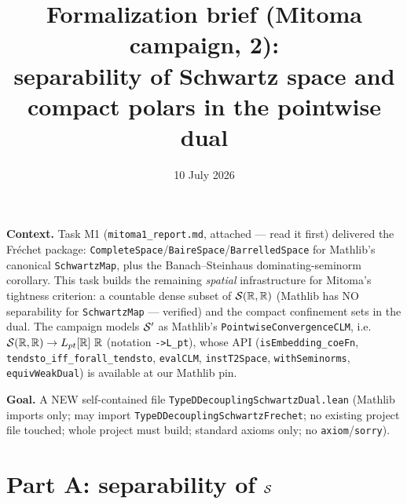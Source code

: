 \documentclass[11pt]{article}
\title{Formalization brief (Mitoma campaign, 2):\\
separability of Schwartz space and compact polars in the pointwise dual}
\date{10 July 2026}
\theoremstyle{plain}
\theoremstyle{remark}
\begin{document}
\maketitle

\noindent\textbf{Context.} Task M1 (\texttt{mitoma1\_report.md}, attached ---
read it first) delivered the Fr\'echet package:
\texttt{CompleteSpace}/\texttt{BaireSpace}/\texttt{BarrelledSpace} for
Mathlib's canonical \texttt{SchwartzMap}, plus the Banach--Steinhaus
dominating-seminorm corollary. This task builds the remaining
\emph{spatial} infrastructure for Mitoma's tightness criterion: a countable
dense subset of $\mathcal{S}(\mathbb{R},\mathbb{R})$ (Mathlib has NO separability for
\texttt{SchwartzMap} --- verified) and the compact confinement sets in the
dual. The campaign models $\mathcal{S}'$ as Mathlib's
\texttt{PointwiseConvergenceCLM}, i.e.\ $\mathcal{S}(\mathbb{R},\mathbb{R})\to L_{pt}[\mathbb{R}]\ \mathbb{R}$
(notation \texttt{->L\_pt}), whose API
(\texttt{isEmbedding\_coeFn}, \texttt{tendsto\_iff\_forall\_tendsto},
\texttt{evalCLM}, \texttt{instT2Space}, \texttt{withSeminorms},
\texttt{equivWeakDual}) is available at our Mathlib pin.

\medskip
\noindent\textbf{Goal.} A NEW self-contained file
\texttt{TypeDDecouplingSchwartzDual.lean} (Mathlib imports only; may import
\texttt{TypeDDecouplingSchwartzFrechet}; no existing project file touched;
whole project must build; standard axioms only; no
\texttt{axiom}/\texttt{sorry}).

\section*{Part A: separability of $\mathcal{S}$}
\end{document}
